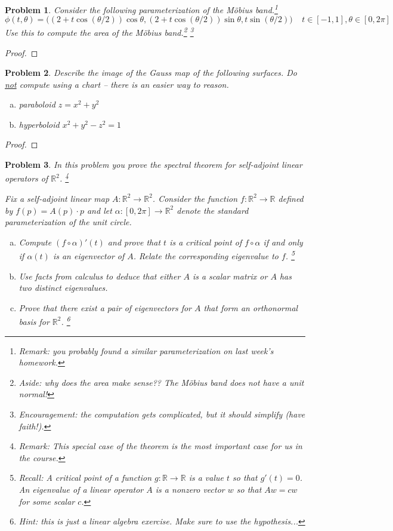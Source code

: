 \documentclass[11pt]{article}
\newtheorem{problem}{Problem}
\begin{document}
\pagebreak


\begin{problem}
Consider the following parameterization of the M\"obius band.\footnote{Remark: you probably found a similar parameterization on last week's homework.} 
\[\phi(t,\theta)=\big(
(2+t\cos(\theta/2))\cos\theta, 
(2+t\cos(\theta/2))\sin\theta, 
t\sin(\theta/2)
\big)\>\>\>\>\>t\in[-1,1],\theta\in[0,2\pi]\]
Use this to compute the area of the M\"obius band.\footnote{Aside: why does the area make sense?? The M\"obius band does not have a unit normal!}  \footnote{Encouragement: the computation gets complicated, but it should simplify (have faith!).}
\end{problem}

\begin{proof}

\end{proof}

\pagebreak


\begin{problem}
Describe the image of the Gauss map of the following surfaces. Do \underline{not} compute using a chart -- there is an easier way to reason.
\begin{enumerate}[(a)]
\item paraboloid $z=x^2+y^2$ 
\item hyperboloid $x^2+y^2-z^2=1$
\end{enumerate} 
\end{problem}

\begin{proof}

\end{proof}

\pagebreak

\begin{problem}
In this problem you prove the spectral theorem for self-adjoint linear operators of $\mathbb R^2$. \footnote{Remark: This special case of the theorem is the most important case for us in the course.}

Fix a self-adjoint linear map $A:\mathbb R^2\to\mathbb R^2$. Consider the function $f:\mathbb R^2\to\mathbb R$ defined by $f(p)=A(p)\cdot p$ and let $\alpha:[0,2\pi]\to\mathbb R^2$ denote the standard parameterization of the unit circle. 
\begin{enumerate}[(a)]
\item Compute $(f\circ\alpha)'(t)$ and prove that $t$ is a critical point of $f\circ\alpha$ if and only if $\alpha(t)$ is an eigenvector of $A$. Relate the corresponding eigenvalue to $f$. \footnote{Recall: A critical point of a function $g:\mathbb R\to\mathbb R$ is a value $t$ so that $g'(t)=0$. An eigenvalue of a linear operator $A$ is a nonzero vector $w$ so that $Aw=cw$ for some scalar $c$.}
\item Use facts from calculus to deduce that either $A$ is a scalar matrix or $A$ has two distinct eigenvalues. 
\item Prove that there exist a pair of eigenvectors for $A$ that form an orthonormal basis for $\mathbb R^2$. \footnote{Hint: this is just a linear algebra exercise. Make sure to use the hypothesis...}
\end{enumerate} 
\end{problem}
\end{document}
